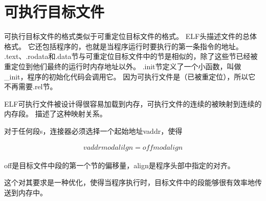 
\section{可执行目标文件}
{
    可执行目标文件的格式类似于可重定位目标文件的格式。
    ELF头描述文件的总体格式。
    它还包括程序的，也就是当程序运行时要执行的第一条指令的地址。
    .text、.rodata和.data节与可重定位目标文件中的节是相似的，除了这些节已经被重定位到他们最终的运行时内存地址以外。
    .init节定义了一个小函数，叫做\_init，程序的初始化代码会调用它。
    因为可执行文件是（已被重定位），所以它不再需要.rel节。

    ELF可执行文件被设计得很容易加载到内存，可执行文件的连续的被映射到连续的内存段。
    描述了这种映射关系。

    对于任何段s，连接器必须选择一个起始地址vaddr，使得

    \begin{align*}
        vaddr mod alilgn = off mod align
    \end{align*}

    off是目标文件中段的第一个节的偏移量，align是程序头部中指定的对齐。

    这个对其要求是一种优化，使得当程序执行时，目标文件中的段能够很有效率地传送到内存中。
}
